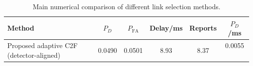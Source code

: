 \begin{table}[t]
    \centering
    \caption{Main numerical comparison of different link selection methods.}
    \label{tab:main_summary}
    \begin{tabular}{l c c c c c}
        \hline
        Method & $P_D$ & $P_{\mathrm{FA}}$ & Delay/ms & Reports & $P_D$/ms \\
        \hline
        Proposed adaptive C2F (detector-aligned) & 0.0490 & 0.0501 & 8.93 & 8.37 & 0.0055 \
        \hline
    \end{tabular}
\end{table}
